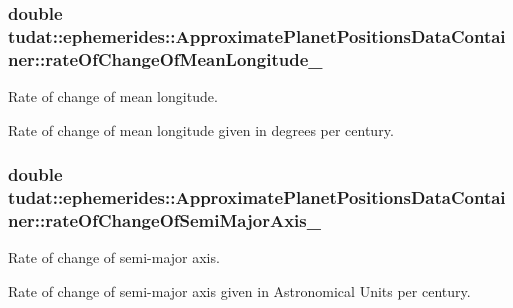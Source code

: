 \subsubsection[{\texorpdfstring{rate\+Of\+Change\+Of\+Mean\+Longitude\+\_\+}{rateOfChangeOfMeanLongitude_}}]{\setlength{\rightskip}{0pt plus 5cm}double tudat\+::ephemerides\+::\+Approximate\+Planet\+Positions\+Data\+Container\+::rate\+Of\+Change\+Of\+Mean\+Longitude\+\_\+}\hypertarget{structtudat_1_1ephemerides_1_1ApproximatePlanetPositionsDataContainer_ac7ea2134ba05e1025d387e637a2fc72b}{}\label{structtudat_1_1ephemerides_1_1ApproximatePlanetPositionsDataContainer_ac7ea2134ba05e1025d387e637a2fc72b}


Rate of change of mean longitude. 

Rate of change of mean longitude given in degrees per century. 
\subsubsection[{\texorpdfstring{rate\+Of\+Change\+Of\+Semi\+Major\+Axis\+\_\+}{rateOfChangeOfSemiMajorAxis_}}]{\setlength{\rightskip}{0pt plus 5cm}double tudat\+::ephemerides\+::\+Approximate\+Planet\+Positions\+Data\+Container\+::rate\+Of\+Change\+Of\+Semi\+Major\+Axis\+\_\+}\hypertarget{structtudat_1_1ephemerides_1_1ApproximatePlanetPositionsDataContainer_a1c8272dc9e033bf670258943b159bfed}{}\label{structtudat_1_1ephemerides_1_1ApproximatePlanetPositionsDataContainer_a1c8272dc9e033bf670258943b159bfed}


Rate of change of semi-\/major axis. 

Rate of change of semi-\/major axis given in Astronomical Units per century. 
